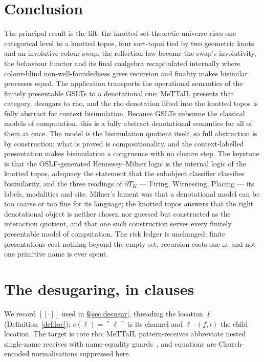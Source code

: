 \documentclass[11pt]{article}
\newcommand{\sem}[1]{[\![#1]\!]}
\newcommand{\refl}[1]{\ulcorner #1 \urcorner}
\newcommand{\dT}{\partial T}
\theoremstyle{plain}
\theoremstyle{definition}
\theoremstyle{remark}
\begin{document}
\section{Conclusion}\label{sec:conclusion}

The principal result is the lift: the knotted set-theoretic universe rises one categorical level to a
knotted topos, four sort-topoi tied by two geometric knots and an involutive colour-swap, the
reflection law become the swap's involutivity, the behaviour functor and its final coalgebra
recapitulated internally where colour-blind non-well-foundedness gives recursion and finality makes
bisimilar processes equal. The application transports the operational semantics of the finitely
presentable GSLTs to a denotational one: MeTTaIL presents that category, desugars to rho, and the rho
denotation lifted into the knotted topos is fully abstract for context bisimulation. Because GSLTs
subsume the classical models of computation, this is a fully abstract denotational semantics for all of
them at once. The model is the bisimulation quotient itself, so full abstraction is by construction;
what is proved is compositionality, and the context-labelled presentation makes bisimulation a
congruence with no closure step. The keystone is that the OSLF-generated Hennessy--Milner logic is the
internal logic of the knotted topos, adequacy the statement that the subobject classifier classifies
bisimilarity, and the three readings of $\dT_K$ --- Firing, Witnessing, Placing --- its labels,
modalities and site. Milner's lament was that a denotational model can be too coarse or too fine for
its language; the knotted topos answers that the right denotational object is neither chosen nor
guessed but constructed as the interaction quotient, and that one such construction serves every
finitely presentable model of computation. The risk ledger is unchanged: finite presentations cost
nothing beyond the empty set, recursion costs one $\omega$, and not one primitive name is ever spent.

\appendix

\section{The desugaring, in clauses}\label{app:desugar}

We record $\sem{\cdot}$ used in \S\ref{sec:desugar}, threading the location $\ell$
(Definition~\ref{def:loc}); $c(\ell)=\refl{\ell}$ is its channel and $\ell\cdot(f,i)$ the child
location. The target is core rho; MeTTaIL pattern-receives abbreviate nested single-name receives with
name-equality guards~\cite[\S2.2]{optimal}, and equations are Church-encoded normalisations suppressed
here.
\end{document}
